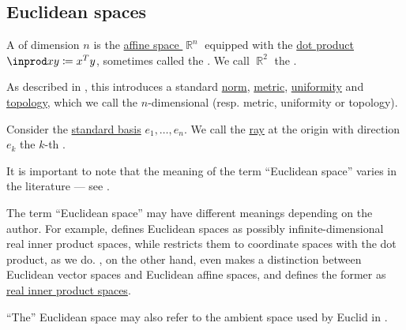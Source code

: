 \subsection{Euclidean spaces}\label{subsec:euclidean_spaces}

\begin{definition}\label{def:euclidean_space}\mimprovised
  A  of dimension \( n \) is the \hyperref[def:affine_space]{affine space \( \BbbR^n \)} equipped with the \hyperref[def:inner_product_space]{dot product} \( \inprod x y \coloneqq x^T y \), sometimes called the . We call \( \BbbR^2 \) the .

  As described in , this introduces a standard \hyperref[def:norm]{norm}, \hyperref[def:metric_space]{metric}, \hyperref[def:uniform_space]{uniformity} and \hyperref[def:topological_space]{topology}, which we call the \( n \)-dimensional  (resp. metric, uniformity or topology).

  Consider the \hyperref[def:sequence_space]{standard basis} \( e_1, \ldots, e_n \). We call the \hyperref[def:geometric_ray]{ray} at the origin with direction \( e_k \) the \( k \)-th .

  It is important to note that the meaning of the term \enquote{Euclidean space} varies in the literature --- see .
\end{definition}

\begin{remark}\label{rem:euclidean_space_etymology}
  The term \enquote{Euclidean space} may have different meanings depending on the author. For example, \cite[sec. 24.1]{Тыртышников2007} defines Euclidean spaces as possibly infinite-dimensional real inner product spaces, while \cite[2.19]{Rudin1986RealAndComplex} restricts them to coordinate spaces with the dot product, as we do. , on the other hand, even makes a distinction between Euclidean vector spaces and Euclidean affine spaces, and defines the former as \hyperref[def:inner_product_space]{real inner product spaces}.

  \enquote{The} Euclidean space may also refer to the ambient space used by Euclid in \cite{Fitzpatrick2008}.
\end{remark}

